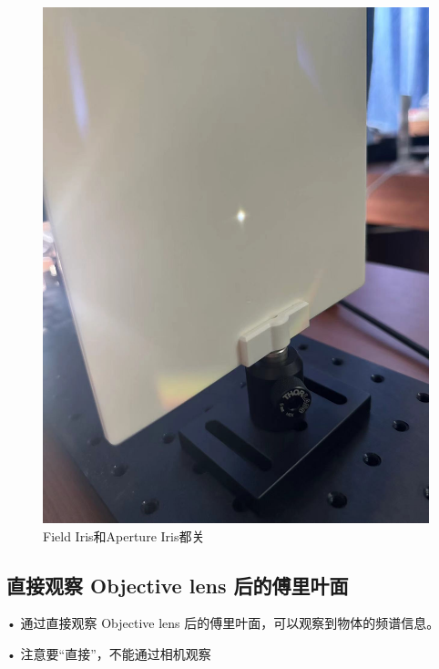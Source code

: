 \documentclass{ctexart}
\begin{document}
\begin{figure}[H]
\begin{minipage}[b]{0.2\textwidth}
    \includegraphics[width=\textwidth]{pictures/微信图片_20241010201025.jpg}
    \caption{Field Iris和Aperture Iris都关}
  \end{minipage}
\end{figure}
\subsection{直接观察 Objective lens 后的傅里叶面}
• 通过直接观察 Objective lens 后的傅里叶面，可以观察到物体的频谱信息。

• 注意要“直接”，不能通过相机观察
\end{document}

